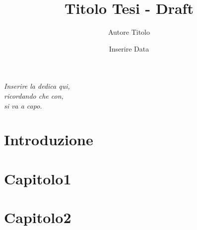 \documentclass[11pt,a4paper,oneside,openright,regno]{book}
\title{Titolo Tesi - Draft}
\author{Autore Titolo}
\date{Inserire Data}
\begin{document}
\frontmatter
\maketitle


\clearpage
\thispagestyle{empty}
\phantom{a}
\vfill
\newpage
\vfill


\clearpage
\thispagestyle{empty}
\null{}
\begin{flushright}
\textit{Inserire la dedica qui,\\
ricordando che con,\\
si va a capo.}
\end{flushright}
\null

\clearpage
\thispagestyle{empty}
\phantom{a}
\vfill
\newpage
\vfill
\addtocounter{page}{-1}


\tableofcontents
\mainmatter
\chapter*{Introduzione}

\chapter{Capitolo1}

\chapter{Capitolo2}


\clearpage
\thispagestyle{empty}
\phantom{a}
\vfill
\newpage
\vfill
\addtocounter{page}{-1}

\end{document}
